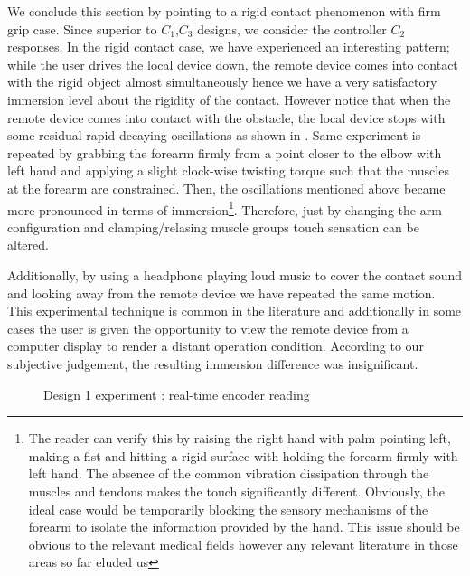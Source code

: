 We conclude this section by pointing to a rigid contact phenomenon with firm grip case. Since superior to $C_1$,$C_3$ designs, we consider
the controller $C_2$ responses. In the rigid contact case, we have experienced an interesting pattern; while the user drives the local 
device down, the remote device comes into contact with the rigid object almost simultaneously hence we have a very satisfactory immersion level 
about the rigidity of the contact. However notice that when the remote device comes into contact with the obstacle, the local device stops 
with some residual rapid decaying oscillations as shown in . Same experiment is repeated by grabbing the 
forearm firmly from a point closer to the elbow with left hand and applying a slight clock-wise twisting torque such that the muscles 
at the forearm are constrained. Then, the oscillations mentioned above became more pronounced in terms of immersion\footnote{The reader can 
verify this by raising the right hand with palm pointing left, making a fist and hitting a rigid surface with holding the forearm firmly with 
left hand. The absence of the common vibration dissipation through the muscles and tendons makes the touch significantly different. Obviously, 
the ideal case would be temporarily blocking the sensory mechanisms of the forearm to isolate the information provided by the hand. This issue
should be obvious to the relevant medical fields however any relevant literature in those areas so far eluded us}. Therefore, just by changing 
the arm configuration and clamping/relasing muscle groups touch sensation can be altered. 

Additionally, by using a headphone playing loud music to cover the contact sound and looking away from the remote device we have repeated the same
motion. This experimental technique is common in the literature and additionally in some cases the user is given the opportunity to view the remote 
device from a computer display to render a distant operation condition. According to our subjective judgement, the resulting immersion difference was 
insignificant. 


\newpage

\begin{figure}%
\centering
{}
\caption{Design 1 experiment : real-time encoder reading}%
\label{fig:app:design1overall}%
\end{figure}


